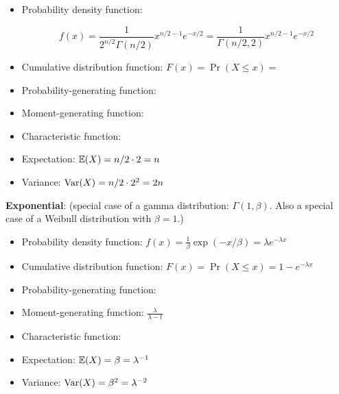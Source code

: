 \begin{itemize}

\item Probability density function: 

\[
f(x)  = \frac{1}{2^{n/2}\Gamma(n/2)} x^{n/2 - 1} e^{-x/2} = \frac{1}{\Gamma(n/2, 2)} x^{n/2 - 1} e^{-x/2}
\]

\item Cumulative distribution function: \(F(x) = \Pr(X \leq x) = \)

\item Probability-generating function:

\item Moment-generating function:

\item Characteristic function:

\item Expectation: \(\E(X) = n/2 \cdot 2 = n \)

\item Variance: \(\Var(X) = n/2 \cdot 2^2 = 2n\)

\end{itemize}


\textbf{Exponential}: \label{prob.exp} (special case of a gamma distribution: \(\Gamma(1, \beta)\). Also a special case of a Weibull distribution with \(\beta = 1\).)

\begin{itemize}

\item Probability density function: \(f(x) = \frac{1}{\beta} \exp(-x/\beta) = \lambda e^{- \lambda x} \)

\item Cumulative distribution function: \(F(x) = \Pr(X \leq x) = 1 - e^{-\lambda x}\)

\item Probability-generating function:

\item Moment-generating function: \(\frac{\lambda}{\lambda - t}\)

\item Characteristic function:

\item Expectation: \(\E(X) = \beta = \lambda^{-1} \)

\item Variance: \(\Var(X) = \beta^2 = \lambda^{-2}  \)

\end{itemize}

